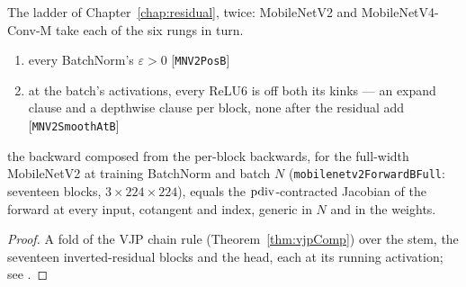 The ladder of Chapter~\ref{chap:residual}, twice: MobileNetV2 and
MobileNetV4-Conv-M take each of the six rungs in turn.

\begin{theorem}
  \label{thm:mobilenetv2FullHasVJP}
  \leanok
  \Assume{}
  \begin{enumerate}
    \item every BatchNorm's \(\varepsilon > 0\) \hfill[\texttt{MNV2PosB}]
    \item at the batch's activations, every ReLU6 is off both its kinks ---
          an expand clause and a depthwise clause per block, none after the
          residual add \hfill[\texttt{MNV2SmoothAtB}]
  \end{enumerate}
  \Prove{} the backward composed from the per-block backwards, for the
  full-width MobileNetV2 at training BatchNorm and batch \(N\)
  (\texttt{mobilenetv2ForwardBFull}: seventeen blocks,
  \(3 \times 224 \times 224\)), equals the \(\operatorname{pdiv}\)-contracted Jacobian of
  the forward at every input, cotangent and index, generic in \(N\) and in
  the weights.
\end{theorem}

\begin{proof}
\leanok
A fold of the VJP chain rule (Theorem~\ref{thm:vjpComp}) over the stem, the
seventeen inverted-residual blocks and the head, each at its running
activation; see .
\end{proof}

